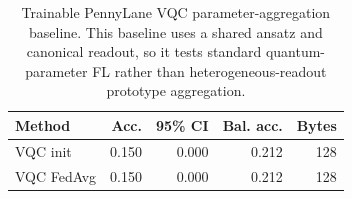 ﻿\begin{table}[t]
\centering
\caption{Trainable PennyLane VQC parameter-aggregation baseline. This baseline uses a shared ansatz and canonical readout, so it tests standard quantum-parameter FL rather than heterogeneous-readout prototype aggregation.}
\label{tab:quantum-param-vqc}
\begin{tabular}{lrrrr}
\toprule
Method & Acc. & 95\% CI & Bal. acc. & Bytes \\
\midrule
VQC init & 0.150 & 0.000 & 0.212 & 128 \\
VQC FedAvg & 0.150 & 0.000 & 0.212 & 128 \\
\bottomrule
\end{tabular}
\end{table}

